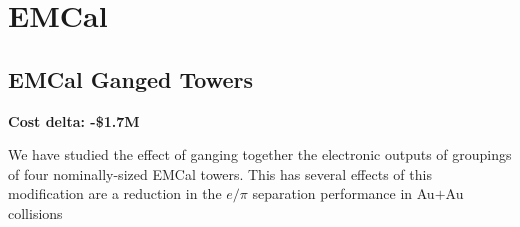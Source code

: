 \section{EMCal}
\subsection{EMCal Ganged Towers}
\label{emcal_ganging}

\textbf{Cost delta: -\$1.7M}

We have studied the effect of ganging together the electronic outputs
of groupings of four nominally-sized EMCal towers.  This has several 
effects of this modification are a reduction in the $e/\pi$ separation
performance in Au$+$Au collisions

